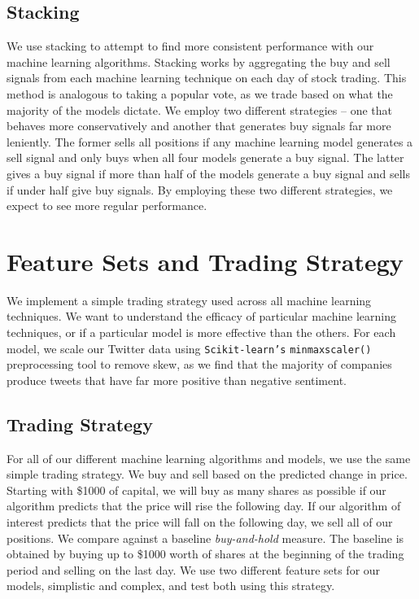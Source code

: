 \documentclass[../thesis.tex]{subfiles}
\begin{document}
\subsection{Stacking}
We use stacking to attempt to find more consistent performance with our machine learning algorithms. Stacking works by aggregating the buy and sell signals from each machine learning technique on each day of stock trading. This method is analogous to taking a popular vote, as we trade based on what the majority of the models dictate. We employ two different strategies -- one that behaves more conservatively and another that generates buy signals far more leniently. The former sells all positions if any machine learning model generates a sell signal and only buys when all four models generate a buy signal. The latter gives a buy signal if more than half of the models generate a buy signal and sells if under half give buy signals. By employing these two different strategies, we expect to see more regular performance. 

\section{Feature Sets and Trading Strategy }
\label{features}

We implement a simple trading strategy used across all machine learning techniques. We want to understand the efficacy of particular machine learning techniques, or if a particular model is more effective than the others. For each model, we scale our Twitter data using \texttt{Scikit-learn's} \texttt{minmaxscaler()} preprocessing tool to remove skew, as we find that the majority of companies produce tweets that have far more positive than negative sentiment. 

\subsection{Trading Strategy}

For all of our different machine learning algorithms and models, we use the same simple trading strategy. We buy and sell based on the predicted change in price. Starting with \$1000 of capital, we will buy as many shares as possible if our algorithm predicts that the price will rise the following day. If our algorithm of interest predicts that the price will fall on the following day, we sell all of our positions. We compare against a baseline \textit{buy-and-hold} measure. The baseline is obtained by buying up to \$1000 worth of shares at the beginning of the trading period and selling on the last day. We use two different feature sets for our models, simplistic and complex, and test both using this strategy. 
\end{document}
